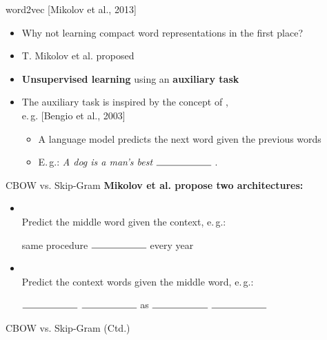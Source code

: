 \begin{frame}{word2vec [Mikolov et al., 2013]}{}
	\begin{itemize}
		\item Why not learning compact word representations in the first place?
		\item T. Mikolov et al. proposed 
		\item \textbf{Unsupervised learning} using an \textbf{auxiliary task}
		\item The auxiliary task is inspired by the concept of , \\ e.\,g. [Bengio et al., 2003]
		\begin{itemize}
			\item A language model predicts the next word given the previous words
			\item E.\,g.: \textit{A dog is a man's best} $\rule{2cm}{0.15mm}$ .
		\end{itemize} 
	\end{itemize}
\end{frame}


\begin{frame}{CBOW vs. Skip-Gram}{}
	\textbf{Mikolov et al. propose two architectures:} \vspace*{2mm}
	\begin{itemize}
		\item {} \\
			Predict the middle word given the context, e.\,g.:
		\vspace*{2mm}
		\begin{center}
			same procedure $\rule{2cm}{0.15mm}$ every year
		\end{center}
		\vspace*{2mm}
		\item {} \\
			Predict the context words given the middle word, e.\,g.:
		\vspace*{2mm}
		\begin{center}
			$\rule{2cm}{0.15mm}$ $\rule{2cm}{0.15mm}$ as $\rule{2cm}{0.15mm}$ $\rule{2cm}{0.15mm}$
		\end{center}
	\end{itemize}
\end{frame}


\begin{frame}{CBOW vs. Skip-Gram (Ctd.)}{}
\end{frame}



